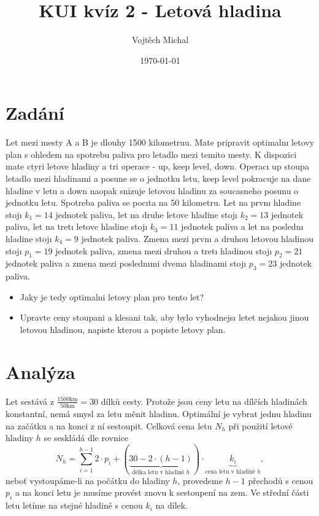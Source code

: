 \documentclass[twoside]{article}
\title{KUI kvíz 2 - Letová hladina}
\author{Vojtěch Michal}
\date{\today}
\begin{document}
\maketitle


\section{Zadání}
Let mezi mesty A a B je dlouhy 1500 kilometruu. Mate pripravit optimalnı letovy plan s ohledem na
spotrebu paliva pro letadlo mezi temito mesty. K dispozici mate ctyri letove hladiny a tri operace -
up, keep level, down. Operacı up stoupa letadlo mezi hladinami a posune se o jednotku letu, keep
level pokracuje na dane hladine v letu a down naopak snizuje letovou hladinu za soucasneho posunu o
jednotku letu. Spotreba paliva se pocıta na 50 kilometru. Let na prvnı hladine stojı $k_1 = 14$ jednotek paliva,
let na druhe letove hladine stojı $k_2 = 13$ jednotek paliva, let na tretı letove hladine stojı $k_3 = 11$ jednotek paliva
a let na poslednı hladine stojı $k_4 = 9$ jednotek paliva. Zmena mezi prvnı a druhou letovou hladinou stojı $p_1 = 19$
jednotek paliva, zmena mezi druhou a tretı hladinou stojı $p_2 = 21$ jednotek paliva a zmena mezi poslednımi
dvema hladinami stojı $p_3 = 23$ jednotek paliva.

\begin{itemize}
	\item Jaky je tedy optimalni letovy plan pro tento let?
	\item Upravte ceny stoupani a klesani tak, aby bylo vyhodnejsı letet nejakou jinou letovou hladinou, napiste kterou a popiste letovy plan.
\end{itemize}

\section{Analýza}
Let sestává z $\frac{1500 \text{km} }{50 \text{km} } = 30$ dílků cesty. Protože jsou ceny letu na dílčích hladinách
konstantní, nemá smysl za letu měnit hladinu. Optimální je vybrat jednu hladinu na začátku a na konci z ní sestoupit.
Celková cena letu $N_h$ při použití letové hladiny $h$ se seskládá dle rovnice
\begin{equation}
	\label{eq:cena}
	N_h = \sum_{i=1}^{h-1} 2 \cdot p_i + (\underbrace{30 - 2\cdot (h-1)}_{\text{délka letu v hladině $h$}}) \cdot \underbrace{k_i}_{\text{cena letu v hladině $h$}},
\end{equation}
neboť vystoupáme-li na počátku do hladiny $h$, provedeme $h-1$ přechodů s cenou $p_i$ a na konci letu je musíme provést znovu k sestoupení na zem.
Ve střední části letu letíme na stejné hladině s cenou $k_i$ na dílek.
\end{document}
